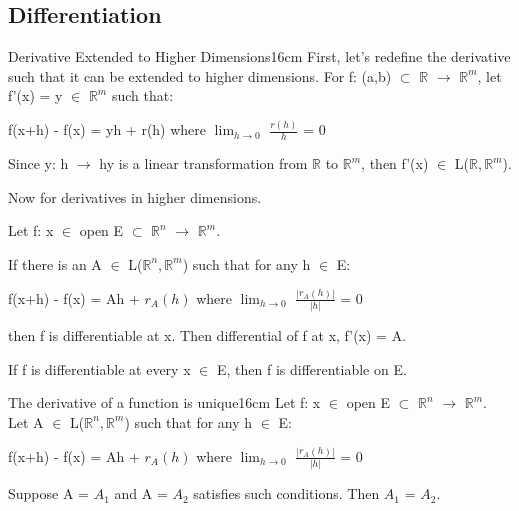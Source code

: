     \vspace{0.5cm}





\subsection{ Differentiation }

    \begin{definition}{Derivative Extended to Higher Dimensions}{16cm}
        First, let's redefine the derivative such that it can be extended to
        higher dimensions.
        For f: (a,b) $\subset$ $\mathbb{R}$ $\rightarrow$ $\mathbb{R}^m$,
        let f'(x) = y $\in$ $\mathbb{R}^m$ such that:

        \hspace{0.5cm}
        f(x+h) - f(x) = yh + r(h)
        \hspace{1cm}
        where $\lim_{h \rightarrow 0}$ $\frac{r(h)}{h}$ = 0

        Since y: h $\rightarrow$ hy is a linear transformation
        from $\mathbb{R}$ to $\mathbb{R}^m$, then
        f'(x) $\in$ L($\mathbb{R},\mathbb{R}^m$).

        \vspace{0.3cm}

        Now for derivatives in higher dimensions.
        
        Let f: x $\in$ open E $\subset$ $\mathbb{R}^n$ $\rightarrow$ $\mathbb{R}^m$.
        
        If there is an A $\in$ L($\mathbb{R}^n,\mathbb{R}^m$) such that
        for any h $\in$ E:

        \hspace{0.5cm}
        f(x+h) - f(x) = Ah + $r_A(h)$
        \hspace{1cm}
        where $\lim_{h \rightarrow 0}$ $\frac{|r_A(h)|}{|h|}$ = 0

        then f is {\color{lblue} differentiable} at x.
        Then {\color{lblue} differential} of f at x, f'(x) = A.

        If f is differentiable at every x $\in$ E, then f is differentiable on E.
    \end{definition}

    \vspace{0.5cm}



    \begin{wtheorem}{The derivative of a function is unique}{16cm}
        Let f: x $\in$ open E $\subset$ $\mathbb{R}^n$ $\rightarrow$ $\mathbb{R}^m$.
        Let A $\in$ L($\mathbb{R}^n,\mathbb{R}^m$) such that
        for any h $\in$ E:

        \hspace{0.5cm}
        f(x+h) - f(x) = Ah + $r_A(h)$
        \hspace{1cm}
        where $\lim_{h \rightarrow 0}$ $\frac{|r_A(h)|}{|h|}$ = 0

        Suppose A = $A_1$ and A = $A_2$ satisfies such conditions.
        Then $A_1$ = $A_2$.
    \end{wtheorem}

